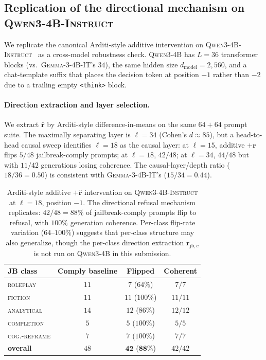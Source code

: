 \documentclass{article}
\newcommand{\rhat}{\hat{\bm{r}}}
\newcommand{\rvec}{\bm{r}}
\newcommand{\rjbc}{\bm{r}_{\mathrm{jb},c}}
\newcommand{\gemma}{\textsc{Gemma-3-4B-IT}}
\begin{document}
\subsection{Replication of the directional mechanism on
\textsc{Qwen3-4B-Instruct}}
\label{app:qwen}

We replicate the canonical Arditi-style additive intervention on
\textsc{Qwen3-4B-Instruct}~\citep{qwenteam2025qwen3} as a cross-model
robustness check. \textsc{Qwen3-4B} has $L = 36$ transformer blocks
(vs.\ \gemma{}'s $34$), the same hidden size $d_{\mathrm{model}} =
2{,}560$, and a chat-template suffix that places the decision token
at position $-1$ rather than $-2$ due to a trailing empty
\texttt{<think>} block.

\paragraph{Direction extraction and layer selection.}
We extract $\rhat$ by Arditi-style difference-in-means on the same
$64+64$ prompt suite. The maximally separating layer is $\ell = 34$
(Cohen's $d \approx 85$), but a head-to-head causal sweep identifies
$\ell = 18$ as the causal layer: at $\ell = 15$, additive $+\rvec$
flips $5/48$ jailbreak-comply prompts; at $\ell = 18$, $42/48$; at
$\ell = 34$, $44/48$ but with $11/42$ generations losing coherence.
The causal-layer/depth ratio ($18/36 = 0.50$) is consistent with
\gemma{}'s ($15/34 = 0.44$).

\begin{table}[!h]
\centering
\small
\setlength{\tabcolsep}{4pt}
\begin{tabular}{lccc}
\toprule
JB class & Comply baseline & Flipped & Coherent \\
\midrule
\textsc{roleplay}            & $11$ & $7$ ($64\%$)   & $7/7$ \\
\textsc{fiction}             & $11$ & $11$ ($100\%$) & $11/11$ \\
\textsc{analytical}          & $14$ & $12$ ($86\%$)  & $12/12$ \\
\textsc{completion}          & $5$  & $5$ ($100\%$)  & $5/5$ \\
\textsc{cog.-reframe}        & $7$  & $7$ ($100\%$)  & $7/7$ \\
\midrule
\textbf{overall}             & $48$ & $\mathbf{42}$ ($\mathbf{88\%}$) & $42/42$ \\
\bottomrule
\end{tabular}
\caption{Arditi-style additive $+\rhat$ intervention on
\textsc{Qwen3-4B-Instruct} at $\ell = 18$, position $-1$. The
directional refusal mechanism replicates: $42/48 = 88\%$ of
jailbreak-comply prompts flip to refusal, with $100\%$ generation
coherence. Per-class flip-rate variation ($64$--$100\%$) suggests
that per-class structure may also generalize, though the per-class
direction extraction $\rjbc$ is not run on \textsc{Qwen3-4B} in this
submission.}
\label{tab:qwen-arditi}
\end{table}
\end{document}
